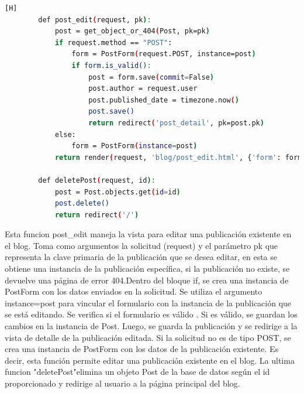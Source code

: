\documentclass{article}
\begin{document}
	\begin{lstlisting}[language=bash,caption={Segunda parte de views.py}][H]
        def post_edit(request, pk):
            post = get_object_or_404(Post, pk=pk)
            if request.method == "POST":
                form = PostForm(request.POST, instance=post)
                if form.is_valid():
                    post = form.save(commit=False)
                    post.author = request.user
                    post.published_date = timezone.now()
                    post.save()
                    return redirect('post_detail', pk=post.pk)
            else:
                form = PostForm(instance=post)
            return render(request, 'blog/post_edit.html', {'form': form})

        def deletePost(request, id):
            post = Post.objects.get(id=id)
            post.delete()
            return redirect('/')
	\end{lstlisting}
        Esta funcion post\_edit maneja la vista para editar una publicación existente en el blog. Toma como argumentos la solicitud (request) y el parámetro pk que representa la clave primaria de la publicación que se desea editar, en esta se obtiene una instancia de la publicación específica, si la publicación no existe, se devuelve una página de error 404.Dentro del bloque if, se crea una instancia de PostForm con los datos enviados en la solicitud. Se utiliza el argumento instance=post para vincular el formulario con la instancia de la publicación que se está editando.
        Se verifica si el formulario es válido . Si es válido, se guardan los cambios en la instancia de Post. Luego, se guarda la publicación y se redirige a la vista de detalle de la publicación editada.
        Si la solicitud no es de tipo POST, se crea una instancia de PostForm con los datos de la publicación existente. Es decir, esta función permite editar una publicación existente en el blog.
        La ultima funcion "deletePost"elimina un objeto Post de la base de datos según el id proporcionado y redirige al usuario a la página principal del blog.
\end{document}
